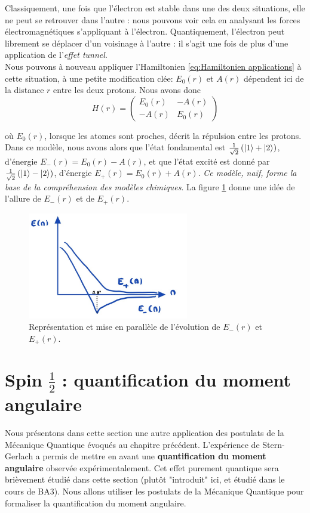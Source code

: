 \documentclass[../notesdecours.tex]{subfiles}
\begin{document}
Classiquement, une fois que l'électron est stable dans une des deux situations, elle ne peut se retrouver dans l'autre : nous pouvons voir cela en analysant les forces électromagnétiques s'appliquant à l'électron. Quantiquement, l'électron peut librement se déplacer d'un voisinage à l'autre : il s'agit une fois de plus d'une application de l'\textit{effet tunnel}.\\

Nous pouvons à nouveau appliquer l'Hamiltonien \eqref{eq:Hamiltonien applications} à cette situation, à une petite modification clée: $E_0(r)$ et $A(r)$ dépendent ici de la distance $r$ entre les deux protons. Nous avons donc
\begin{equation}
    H(r) = \begin{pmatrix}
        E_0(r) & -A(r)\\
        -A(r) & E_0(r)
    \end{pmatrix}
\end{equation}

où $E_0(r)$, lorsque les atomes sont proches, décrit la répulsion entre les protons.\\

Dans ce modèle, nous avons alors que l'état fondamental est $\frac{1}{\sqrt{2}}\left(\ket{1}+\ket{2}\right)$, d'énergie $E_-(r) = E_0(r)-A(r)$, et que l'état excité est donné par $\frac{1}{\sqrt{2}}\left(\ket{1}-\ket{2}\right)$, d'énergie $E_+(r) = E_0(r)+A(r)$. \emph{Ce modèle, naïf, forme la base de la compréhension des modèles chimiques}. \color{purple} La figure \ref{fig:comparaison E+ et E-} donne une idée de l'allure de $E_-(r)$ et de $E_+(r)$.\color{black}

\begin{figure}[h]
    \centering
    \includegraphics[width=7cm,scale=0.5]{Chapitre 5/Figure 6.jpg}
    \caption{Représentation et mise en parallèle de l'évolution de $E_-(r)$ et $E_+(r)$.}
    \label{fig:comparaison E+ et E-}
\end{figure}

\section{Spin $\frac{1}{2}$ : quantification du moment angulaire}
Nous présentons dans cette section une autre application des postulats de la Mécanique Quantique évoqués au chapitre précédent. L'expérience de Stern-Gerlach a permis de mettre en avant une \textbf{quantification du moment angulaire} observée expérimentalement. Cet effet purement quantique sera brièvement étudié dans cette section (plutôt "introduit" ici, et étudié dans le cours de BA3). Nous allons utiliser les postulats de la Mécanique Quantique pour formaliser la quantification du moment angulaire. \\
\end{document}
